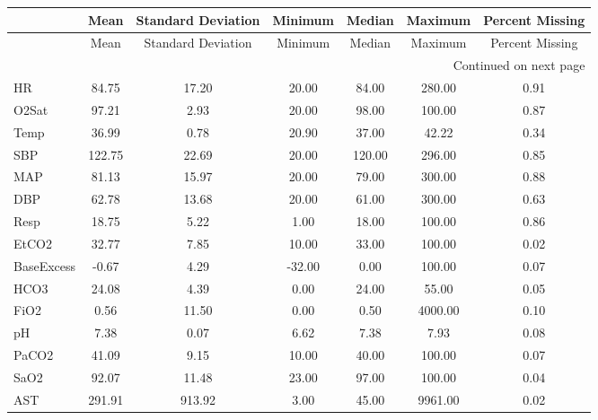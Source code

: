 \begin{longtable}{lcccccc}
\label{tab_describe}\\
\toprule
{} &   Mean & Standard Deviation &  Minimum & Median & Maximum & Percent Missing \\
\midrule
\endfirsthead

\toprule
{} &   Mean & Standard Deviation &  Minimum & Median & Maximum & Percent Missing \\
\midrule
\endhead
\midrule
\multicolumn{7}{r}{{Continued on next page}} \\
\midrule
\endfoot

\bottomrule
\endlastfoot
HR               &  84.75 &              17.20 &    20.00 &  84.00 &  280.00 &            0.91 \\
O2Sat            &  97.21 &               2.93 &    20.00 &  98.00 &  100.00 &            0.87 \\
Temp             &  36.99 &               0.78 &    20.90 &  37.00 &   42.22 &            0.34 \\
SBP              & 122.75 &              22.69 &    20.00 & 120.00 &  296.00 &            0.85 \\
MAP              &  81.13 &              15.97 &    20.00 &  79.00 &  300.00 &            0.88 \\
DBP              &  62.78 &              13.68 &    20.00 &  61.00 &  300.00 &            0.63 \\
Resp             &  18.75 &               5.22 &     1.00 &  18.00 &  100.00 &            0.86 \\
EtCO2            &  32.77 &               7.85 &    10.00 &  33.00 &  100.00 &            0.02 \\
BaseExcess       &  -0.67 &               4.29 &   -32.00 &   0.00 &  100.00 &            0.07 \\
HCO3             &  24.08 &               4.39 &     0.00 &  24.00 &   55.00 &            0.05 \\
FiO2             &   0.56 &              11.50 &     0.00 &   0.50 & 4000.00 &            0.10 \\
pH               &   7.38 &               0.07 &     6.62 &   7.38 &    7.93 &            0.08 \\
PaCO2            &  41.09 &               9.15 &    10.00 &  40.00 &  100.00 &            0.07 \\
SaO2             &  92.07 &              11.48 &    23.00 &  97.00 &  100.00 &            0.04 \\
AST              & 291.91 &             913.92 &     3.00 &  45.00 & 9961.00 &            0.02 \\

\end{longtable}
